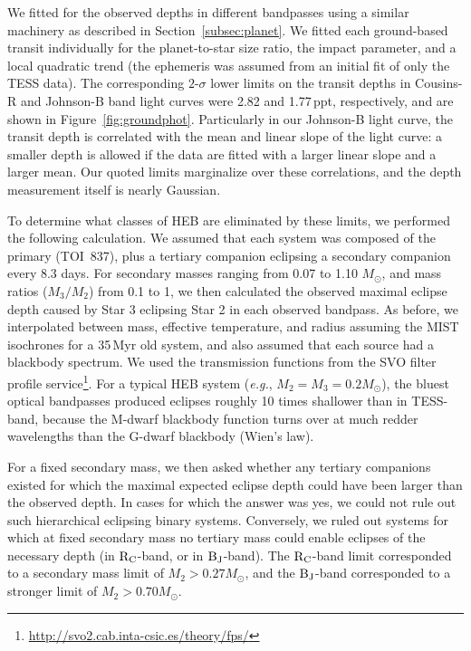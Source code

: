 \documentclass[12pt,twocolumn,tighten]{aastex63}
\newcommand{\tn}{TOI~837} %
\begin{document}
We fitted for the observed depths in different bandpasses using a
similar machinery as described in Section~\ref{subsec:planet}.  We
fitted each ground-based transit individually for the planet-to-star
size ratio, the impact parameter, and a local quadratic trend (the
ephemeris was assumed from an initial fit of only the TESS data).  The
corresponding $2$-$\sigma$ lower limits on the transit depths in Cousins-R
and Johnson-B band light curves were 2.82 and 1.77$\,$ppt,
respectively, and are shown in Figure~\ref{fig:groundphot}.
Particularly in our Johnson-B light curve, the transit depth is
correlated with the mean and linear slope of the light curve: a
smaller depth is allowed if the data are fitted with a larger linear
slope and a larger mean.  Our quoted limits marginalize over these
correlations, and the depth measurement itself is nearly Gaussian.

To determine what classes of HEB are eliminated by these limits, we
performed the following calculation.  We assumed that each system was
composed of the primary (\tn), plus a tertiary companion eclipsing a
secondary companion every 8.3 days.  For secondary masses ranging from
0.07 to 1.10 $M_\odot$, and mass ratios ($M_3/M_2$) from 0.1 to 1, we
then calculated the observed maximal eclipse depth caused by Star 3
eclipsing Star 2 in each observed bandpass.  As before, we
interpolated between mass, effective temperature, and radius assuming
the MIST isochrones for a 35$\,$Myr old system, and also assumed that
each source had a blackbody spectrum.  We used the transmission
functions from the SVO filter profile
service\footnote{\url{http://svo2.cab.inta-csic.es/theory/fps/}}.  For
a typical HEB system ({\it e.g.}, $M_2=M_3=0.2M_\odot$), the bluest
optical bandpasses produced eclipses roughly 10 times shallower than
in TESS-band, because the M-dwarf blackbody function turns over at
much redder wavelengths than the G-dwarf blackbody (Wien's law).

For a fixed secondary mass, we then asked whether any tertiary
companions existed for which the maximal expected eclipse depth could
have been larger than the observed depth.  In cases for which the
answer was yes, we could not rule out such hierarchical eclipsing
binary systems.  Conversely, we ruled out systems for which at
fixed secondary mass no tertiary mass could enable eclipses of the
necessary depth (in ${\rm R_C}$-band, or in ${\rm B_J}$-band).  The
${\rm R_C}$-band limit corresponded to a secondary mass limit of $M_2
> 0.27 M_\odot$, and the ${\rm B_J}$-band corresponded to a stronger
limit of $M_2 > 0.70 M_\odot$.
\end{document}

